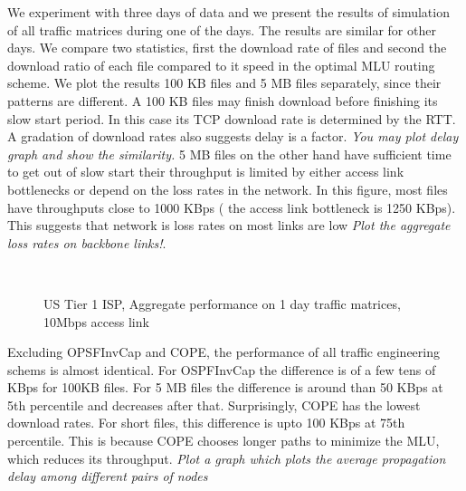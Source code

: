 We experiment with three days of data and we present the results of simulation of all traffic matrices during one of the days. The results are similar for other days. We compare two statistics, first the download rate of files and second the download ratio of each file compared to it speed in the optimal MLU routing scheme. We plot the results 100 KB files and 5 MB files separately, since their patterns are different. A 100 KB files may finish download before finishing its slow start period. In this case its TCP download rate is determined by the RTT. A gradation of download rates also suggests delay is a factor. \emph{You may plot delay graph and show the similarity.} 5 MB files on the other hand have sufficient time to get out of slow start their throughput is limited by either access link bottlenecks or depend on the loss rates in the network. In this figure, most files have throughputs close to 1000 KBps ( the access link bottleneck is 1250 KBps). This suggests that  network is loss rates on most links are low \emph{Plot the aggregate loss rates on backbone links!}.  


\begin{figure}[htp]
  \begin{center}
     \\
  \end{center}
  \caption{US Tier 1 ISP, Aggregate performance on 1 day traffic matrices, 10Mbps access link}
  \label{fig:usisp_aggregate}
\end{figure}

Excluding OPSFInvCap and COPE, the performance of all traffic engineering schems is almost identical. For OSPFInvCap the difference is of a few tens of KBps for 100KB files. For 5 MB files the difference is around than 50 KBps at 5th percentile and decreases after that. Surprisingly, COPE has the lowest download rates.  For short files, this difference is upto 100 KBps at 75th percentile. This is because COPE chooses longer paths to minimize the MLU, which reduces its throughput. \emph{Plot a graph which plots the average propagation delay among different pairs of nodes}

